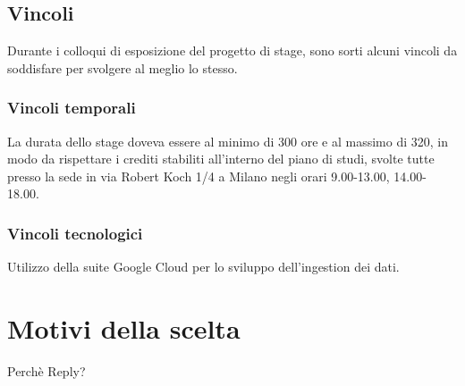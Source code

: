 \subsection{Vincoli}
Durante i colloqui di esposizione del progetto di stage, sono sorti alcuni vincoli da soddisfare per svolgere al meglio lo stesso.\\
\subsubsection{Vincoli temporali}
La durata dello stage doveva essere al minimo di 300 ore e al massimo di 320, in modo da rispettare i crediti stabiliti all'interno del piano di studi, svolte tutte presso la sede in via Robert Koch 1/4 a Milano negli orari 9.00-13.00, 14.00-18.00.
\subsubsection{Vincoli tecnologici}
Utilizzo della suite \gls{Google Cloud} per lo sviluppo dell'ingestion dei dati.
\section{Motivi della scelta}

Perchè Reply?